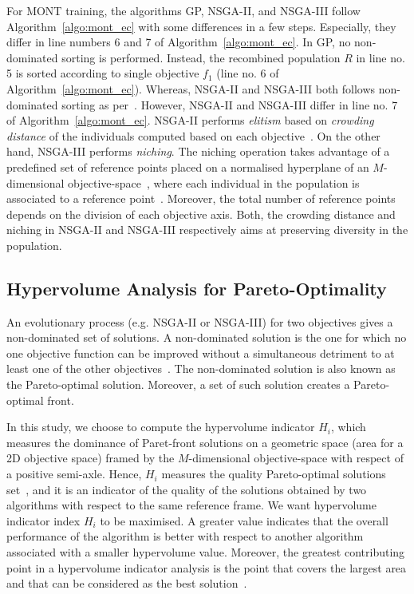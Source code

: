 \documentclass[conference]{IEEEtran}
\begin{document}
For MONT training, the algorithms GP, NSGA-II, and NSGA-III follow Algorithm~\ref{algo:mont_ec} with some differences in a few steps. Especially, they differ in line numbers 6 and 7 of Algorithm~\ref{algo:mont_ec}. In GP, no non-dominated sorting is performed. Instead, the recombined population $ R $ in line no. 5 is sorted according to single objective $ f_1 $ (line no. 6 of Algorithm~\ref{algo:mont_ec}). Whereas, NSGA-II and NSGA-III both follows {non-dominated sorting} as per~\cite{deb2000fast}. However, NSGA-II and NSGA-III differ in line no. 7 of Algorithm~\ref{algo:mont_ec}.  NSGA-II performs \textit{elitism} based on \textit{crowding distance} of the individuals computed based on each objective~\cite{deb2000fast}. On the other hand, NSGA-III performs \textit{niching}. The niching operation takes advantage of a predefined set of reference points placed on a normalised hyperplane of an $ M $-dimensional objective-space~\cite{das1998normal}, where each individual in the population is associated to a reference point~\cite{deb2013evolutionary}. Moreover, the total number of reference points depends on the division of each objective axis. Both, the crowding distance and niching in NSGA-II and NSGA-III respectively aims at preserving diversity in the population.

\subsection{Hypervolume Analysis for Pareto-Optimality}
\label{sec:hv_anl}
An evolutionary process (e.g. NSGA-II or NSGA-III) for two objectives gives a non-dominated set of solutions. A non-dominated solution is the one for which no one objective function can be improved without a simultaneous detriment to at least one of the other objectives~\cite{deb2000fast}. The non-dominated solution is also known as the Pareto-optimal solution. Moreover, a set of such solution creates a Pareto-optimal front. 

In this study, we choose to compute the hypervolume indicator $ H_i $, which measures the dominance of Paret-front solutions on a geometric space (area for a 2D objective space) framed by the $ M $-dimensional objective-space with respect of a positive semi-axle. Hence, $ H_i $ measures the quality Pareto-optimal solutions set~\cite{fonseca2006improved}, and it is an indicator of the quality of the solutions obtained by two algorithms with respect to the same reference frame. 
We want hypervolume indicator index $H_i$ to be maximised. A greater value indicates that the overall performance of the algorithm is better with respect to another algorithm associated with a smaller hypervolume value. Moreover, the greatest contributing point in a hypervolume indicator analysis is the point that covers the largest area and that can be considered as the best solution~\cite{zitzler2003performance}.
\end{document}
